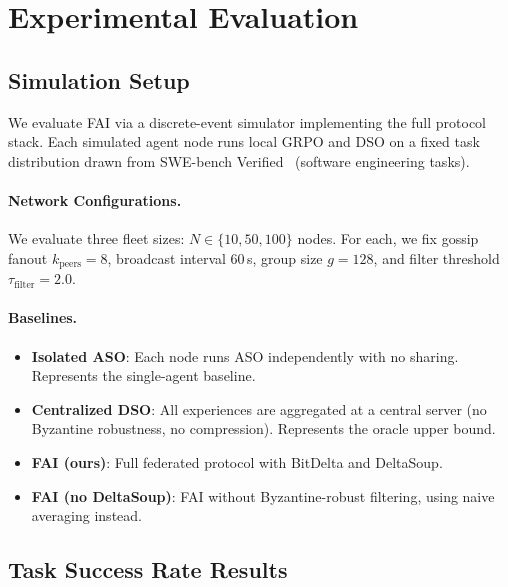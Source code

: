 \documentclass[11pt]{article}
\begin{document}
\section{Experimental Evaluation}
\label{sec:evaluation}

\subsection{Simulation Setup}

We evaluate FAI via a discrete-event simulator implementing the full protocol
stack. Each simulated agent node runs local GRPO and DSO on a fixed task
distribution drawn from SWE-bench Verified~\cite{jimenez2024swebench}
(software engineering tasks).

\paragraph{Network Configurations.}
We evaluate three fleet sizes: $N \in \{10, 50, 100\}$ nodes. For each,
we fix gossip fanout $k_{\text{peers}} = 8$, broadcast interval 60\,s,
group size $g = 128$, and filter threshold $\tau_{\text{filter}} = 2.0$.

\paragraph{Baselines.}
\begin{itemize}[leftmargin=1.5em]
    \item \textbf{Isolated ASO}: Each node runs ASO independently with no
          sharing. Represents the single-agent baseline.
    \item \textbf{Centralized DSO}: All experiences are aggregated at a
          central server (no Byzantine robustness, no compression).
          Represents the oracle upper bound.
    \item \textbf{FAI (ours)}: Full federated protocol with BitDelta and DeltaSoup.
    \item \textbf{FAI (no DeltaSoup)}: FAI without Byzantine-robust filtering,
          using naive averaging instead.
\end{itemize}

\subsection{Task Success Rate Results}
\end{document}
